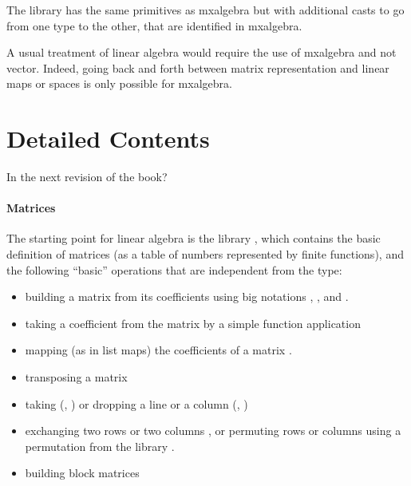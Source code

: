 The library  has the same primitives as mxalgebra
but with additional casts to go from one type to the other, that are
identified in mxalgebra.

A usual treatment of linear algebra would require the use of mxalgebra
and not vector. Indeed, going back and forth between matrix
representation and linear maps or spaces is only possible for
mxalgebra.



\newcommand{\idmat}{\ensuremath{\mathbb{I}}}

\section{Detailed Contents}
In the next revision of the book?

\paragraph{Matrices}

The starting point for linear algebra is the library
, which contains the basic definition of matrices
(as a table of numbers represented by finite functions), and the
following ``basic'' operations that are independent from the type:
\begin{itemize}
\item building a matrix from its coefficients using big notations
  , ,  and .
\item taking a coefficient from the matrix by a simple function
  application 
\item mapping (as in list maps) the coefficients of a matrix
  .
\item transposing a matrix 
\item taking (, ) or dropping a line or a column
  (, )
\item exchanging two rows  or two columns , or
  permuting rows  or columns  using a
  permutation from the library .
\item building block matrices
\end{itemize}

